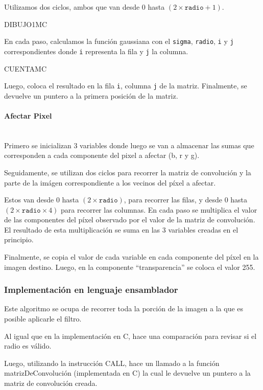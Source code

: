         Utilizamos dos ciclos, ambos que van desde 0 hasta $(2 \times \mathtt{radio} + 1)$. 
        
        DIBUJO1MC

        En cada paso, calculamos la función gaussiana con el \texttt{sigma}, \texttt{radio}, \texttt{i} y \texttt{j} correspondientes donde \texttt{i} representa la fila y \texttt{j} la columna.  
        
        CUENTAMC
    
        Luego, coloca el resultado en la fila \texttt{i}, columna \texttt{j} de la matriz. Finalmente, se devuelve un puntero a la primera posición de la matriz.

      \paragraph{Afectar Pixel} \mbox{} \\
        Primero se inicializan 3 variables donde luego se van a almacenar las sumas que corresponden a cada componente del pixel a afectar (b, r y g). 

        Seguidamente, se utilizan dos ciclos para recorrer la matriz de convolución y la parte de la imágen correspondiente a los vecinos del píxel a afectar.  
        
        Estos van desde $0$ hasta $(2 \times \mathtt{radio})$, para recorrer las filas, y desde $0$ hasta $(2 \times \mathtt{radio} \times 4)$ para recorrer las columnas. En cada paso se multiplica el valor de las componentes del píxel observado por el valor de la matriz de convolución. El resultado de esta multiplicación se suma en las 3 variables creadas en el principio. 
        
        Finalmente, se copia el valor de cada variable en cada componente del píxel en la imagen destino. Luego, en la componente “transparencia” se coloca el valor 255.  

    \subsubsection{Implementación en lenguaje ensamblador} 
      Este algoritmo se ocupa de recorrer toda la porción de la imagen a la que es posible aplicarle el filtro. 
      
      Al igual que en la implementación en C, hace una comparación para revisar si el radio es válido. 
      
      Luego, utilizando la instrucción CALL, hace un llamado a la función matrizDeConvolución (implementada en C) la cual le devuelve un puntero a la matriz de convolución creada. 
      
